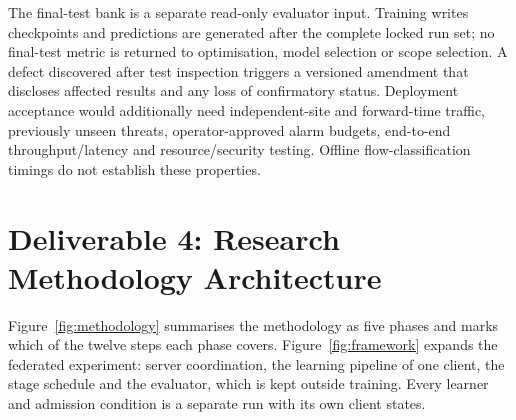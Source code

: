 \documentclass[10pt,a4paper]{article}
\begin{document}
The final-test bank is a separate read-only evaluator input. Training writes checkpoints and predictions are generated after the complete locked run set; no final-test metric is returned to optimisation, model selection or scope selection. A defect discovered after test inspection triggers a versioned amendment that discloses affected results and any loss of confirmatory status. Deployment acceptance would additionally need independent-site and forward-time traffic, previously unseen threats, operator-approved alarm budgets, end-to-end throughput/latency and resource/security testing. Offline flow-classification timings do not establish these properties.

\clearpage
\section{Deliverable 4: Research Methodology Architecture}
Figure~\ref{fig:methodology} summarises the methodology as five phases and marks which of the twelve steps each phase covers. Figure~\ref{fig:framework} expands the federated experiment: server coordination, the learning pipeline of one client, the stage schedule and the evaluator, which is kept outside training. Every learner and admission condition is a separate run with its own client states.
\end{document}
